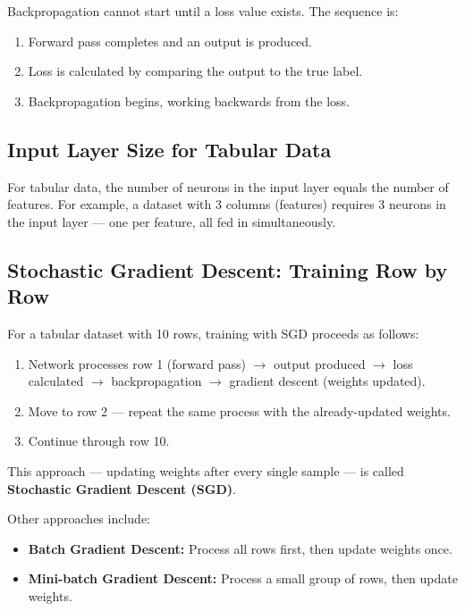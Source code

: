 Backpropagation cannot start until a loss value exists. The sequence is:

\begin{enumerate}
    \item Forward pass completes and an output is produced.
    \item Loss is calculated by comparing the output to the true label.
    \item Backpropagation begins, working backwards from the loss.
\end{enumerate}

\subsection{Input Layer Size for Tabular Data}

For tabular data, the number of neurons in the input layer equals the number of features.
For example, a dataset with 3 columns (features) requires 3 neurons in the input layer
--- one per feature, all fed in simultaneously.

\subsection{Stochastic Gradient Descent: Training Row by Row}

For a tabular dataset with 10 rows, training with SGD proceeds as follows:

\begin{enumerate}
    \item Network processes row 1 (forward pass) $\to$ output produced $\to$ loss
          calculated $\to$ backpropagation $\to$ gradient descent (weights updated).
    \item Move to row 2 --- repeat the same process with the already-updated weights.
    \item Continue through row 10.
\end{enumerate}

This approach --- updating weights after every single sample --- is called
\textbf{Stochastic Gradient Descent (SGD)}.

Other approaches include:
\begin{itemize}
    \item \textbf{Batch Gradient Descent:} Process all rows first, then update weights
          once.
    \item \textbf{Mini-batch Gradient Descent:} Process a small group of rows, then
          update weights.
\end{itemize}

